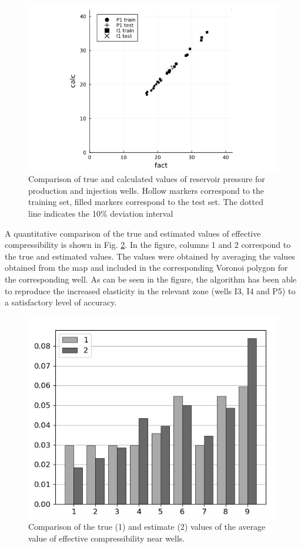\documentclass[
11pt,%
tightenlines,%
twoside,%
onecolumn,%
nofloats,%
nobibnotes,%
nofootinbib,%
superscriptaddress,%
noshowpacs,%
centertags]%
{revtex4}
\begin{document}
\begin{figure}
	\centering
	\includegraphics[width=0.7\linewidth]{fig6}
	\caption{Comparison of true and calculated values of reservoir pressure for production and injection wells. Hollow markers correspond to the training set, filled markers correspond to the test set. The dotted line indicates the 10\% deviation interval}
	\label{fig:cp}
\end{figure}

A quantitative comparison of the true and estimated values of effective compressibility is shown in Fig. \ref{fig:hist}. In the figure, columns 1 and 2 correspond to the true and estimated values. The values were obtained by averaging the values obtained from the map and included in the corresponding Voronoi polygon for the corresponding well. As can be seen in the figure, the algorithm has been able to reproduce the increased elasticity in the relevant zone (wells I3, I4 and P5) to a satisfactory level of accuracy.

\begin{figure}
	\centering
	\includegraphics[width=0.7\linewidth]{fig7}
	\caption{Comparison of the true (1) and estimate (2) values of the average value of effective compressibility near wells.}
	\label{fig:hist}
\end{figure}
\end{document}
